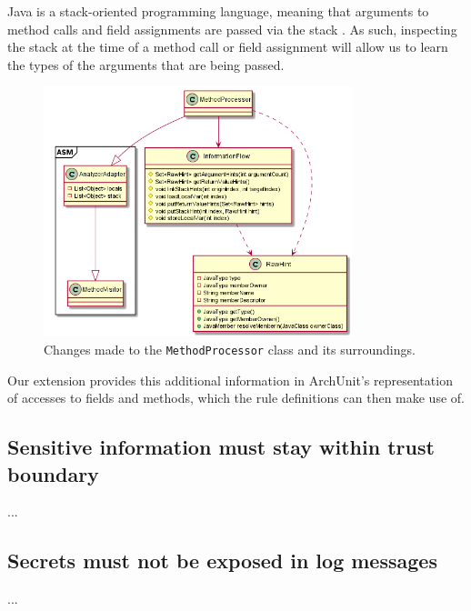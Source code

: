 Java is a stack-oriented programming language, meaning that arguments to method calls and field assignments are passed via the stack \cite{hutchison_information_2005}. As such, inspecting the stack at the time of a method call or field assignment will allow us to learn the types of the arguments that are being passed.

\begin{figure}
    \centering
    \includegraphics[width=0.8\textwidth]{figure/extension/MethodProcessor2.png}
    \caption{Changes made to the \texttt{MethodProcessor} class and its surroundings.}
    \label{fig:method_processor_2}
\end{figure}



Our extension provides this additional information in ArchUnit's representation of accesses to fields and methods, which the rule definitions can then make use of.




\subsection{Sensitive information must stay within trust boundary}
...

\subsection{Secrets must not be exposed in log messages}
...
